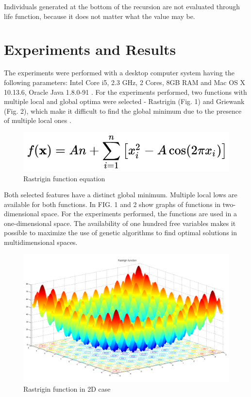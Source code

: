 \documentclass[graybox]{styles/svmult}
\begin{document}
Individuals generated at the bottom of the recursion are not evaluated through life function, because it does not matter what the value may be.

\section{Experiments and Results}
\label{sec:3}

The experiments were performed with a desktop computer system having the following parameters: Intel Core i5, 2.3 GHz, 2 Cores, 8GB RAM and Mac OS X 10.13.6, Oracle Java 1.8.0-91 \cite{balabanov-06}. For the experiments performed, two functions with multiple local and global optima were selected - Rastrigin (Fig. 1) and Griewank (Fig. 2), which make it difficult to find the global minimum due to the presence of multiple local ones \cite{balabanov-07}.

\begin{figure}[b]
\sidecaption
\includegraphics[width=1.0\textwidth]{images/fig01a}
\caption{Rastrigin function equation}
\label{fig:4}
\end{figure}

Both selected features have a distinct global minimum. Multiple local lows are available for both functions. In FIG. 1 and 2 show graphs of functions in two-dimensional space. For the experiments performed, the functions are used in a one-dimensional space. The availability of one hundred free variables makes it possible to maximize the use of genetic algorithms to find optimal solutions in multidimensional spaces.

\begin{figure}[b]
\sidecaption
\includegraphics[width=1.0\textwidth]{images/fig01b}
\caption{Rastrigin function in 2D case}
\label{fig:5}
\end{figure}
\end{document}
